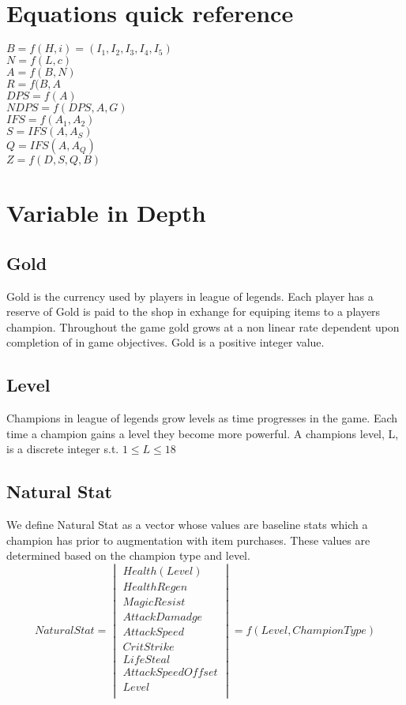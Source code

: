 \documentclass{article}
\begin{document}
\section{Equations quick reference}
$B = f(H,i)=(I_1,I_2,I_3,I_4,I_5)$\\
$N = f(L, c)$\\
$A = f(B,N)$\\
$R=f(B,A$\\
$DPS = f(A)$\\
$NDPS = f(DPS,A,G)$\\
$IFS = f(A_1, A_2)$\\
$S = IFS(A,A_S)$\\
$Q = IFS(A, A_Q)$\\
$Z = f(D,S,Q,B)$\\

\newpage

\section{Variable in Depth}
\subsection{Gold}
Gold is the currency used by players in league of legends.  Each player has a reserve of Gold is paid to the  shop in exhange for equiping items to a players champion.  Throughout the game gold grows at a non linear rate dependent upon completion of in game objectives.  Gold is a positive integer value.
\subsection{Level}
Champions in league of legends grow levels as time progresses in the game. Each time a champion gains a level they become more powerful.  A champions level, L, is a discrete integer s.t. $1\leq L \leq 18 $
\subsection{Natural Stat}
We define Natural Stat as a vector whose values are baseline stats which a champion has prior to augmentation with item purchases.   These values are determined based on the champion type and level.  
\begin{equation}
Natural Stat = 
\begin{vmatrix}
	Health(Level)\\
	Health Regen\\
	Magic Resist \\
	Attack Damadge \\
	Attack Speed \\
	Crit Strike \\
	Life Steal \\
	Attack Speed Offset\\
	Level \\
\end{vmatrix} = f(Level, Champion Type)
\end{equation}
\end{document}
